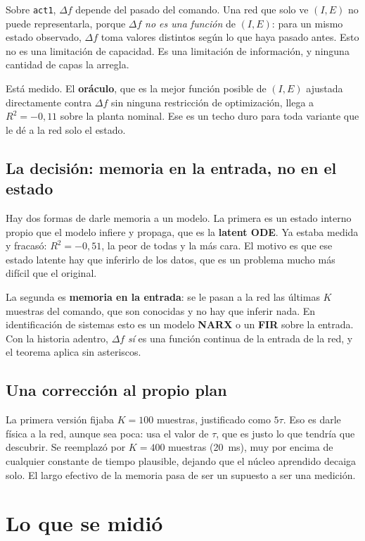 \documentclass[11pt,a4paper]{article}
\newcommand{\term}[1]{\textbf{#1}}
\begin{document}
Sobre \texttt{act1}, $\Delta f$ depende del pasado del comando. Una red que solo
ve $(I, E)$ no puede representarla, porque $\Delta f$ \emph{no es una función}
de $(I,E)$: para un mismo estado observado, $\Delta f$ toma valores distintos
según lo que haya pasado antes. Esto no es una limitación de capacidad. Es una
limitación de información, y ninguna cantidad de capas la arregla.

Está medido. El \term{oráculo}, que es la mejor función posible de $(I,E)$
ajustada directamente contra $\Delta f$ sin ninguna restricción de
optimización, llega a $R^2 = -0{,}11$ sobre la planta nominal. Ese es un techo
duro para toda variante que le dé a la red solo el estado.

\subsection{La decisión: memoria en la entrada, no en el estado}

Hay dos formas de darle memoria a un modelo. La primera es un estado interno
propio que el modelo infiere y propaga, que es la \term{latent ODE}. Ya estaba
medida y fracasó: $R^2 = -0{,}51$, la peor de todas y la más cara. El motivo es
que ese estado latente hay que inferirlo de los datos, que es un problema mucho
más difícil que el original.

La segunda es \term{memoria en la entrada}: se le pasan a la red las últimas
$K$ muestras del comando, que son conocidas y no hay que inferir nada. En
identificación de sistemas esto es un modelo \term{NARX} o un \term{FIR} sobre
la entrada. Con la historia adentro, $\Delta f$ \emph{sí} es una función
continua de la entrada de la red, y el teorema aplica sin asteriscos.

\subsection{Una corrección al propio plan}

La primera versión fijaba $K = 100$ muestras, justificado como $5\tau$. Eso es
darle física a la red, aunque sea poca: usa el valor de $\tau$, que es justo lo
que tendría que descubrir. Se reemplazó por $K = 400$ muestras (20~ms), muy por
encima de cualquier constante de tiempo plausible, dejando que el núcleo
aprendido decaiga solo. El largo efectivo de la memoria pasa de ser un supuesto
a ser una medición.

\section{Lo que se midió}
\end{document}

